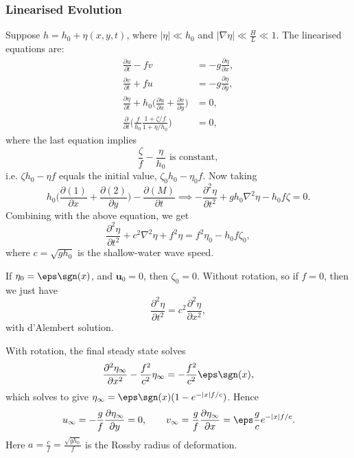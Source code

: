 \documentclass[12pt]{article}
\begin{document}
\subsubsection{Linearised Evolution}
\label{subsub:linearised_evolution}

Suppose $h = h_0 + \eta(x, y, t)$, where $|\eta| \ll h_0$ and $|\nabla \eta| \ll \frac{H}{L} \ll 1$. The linearised equations are:
\begin{align*}
	\frac{\partial u}{\partial t} - fv &= - g \frac{\partial \eta}{\partial x}, \\
	\frac{\partial v}{\partial t} + fu &= - g \frac{\partial \eta}{\partial y}, \\
	\frac{\partial \eta}{\partial t} + h_0 \biggl( \frac{\partial u}{\partial x} + \frac{\partial v}{\partial y} \biggr) &= 0, \\
	\frac{\partial}{\partial t} \biggl( \frac{f}{h_0} \frac{1 + \zeta/f}{1 + \eta/h_0} \biggr) &= 0,
\end{align*}
where the last equation implies
\[
	\frac{\zeta}{f} - \frac{\eta}{h_0} \text{ is constant},
\]
i.e. $\zeta h_0 - \eta f$ equals the initial value, $\zeta_0 h_0 - \eta_0 f$. Now taking
\[
	h_0 \biggl( \frac{\partial (1)}{\partial x} + \frac{\partial (2)}{\partial y} \biggr) - \frac{\partial (M)}{\partial t} \implies - \frac{\partial^2 \eta}{\partial t^2} + gh_0 \nabla^2 \eta - h_0 f \zeta = 0.
\]
Combining with the above equation, we get
\[
\frac{\partial^2 \eta}{\partial t^2} + c^2 \nabla^2 \eta + f^2 \eta = f^2 \eta_0 - h_0 f \zeta_0,
\]
where $c = \sqrt{gh_0}$ is the shallow-water wave speed.

\begin{exbox}
	If $\eta_0 = \eps \sgn(x)$, and $\mathbf{u}_0 = 0$, then $\zeta_0 = 0$. Without rotation, so if $f = 0$, then we just have
	\[
	\frac{\partial^2 \eta}{\partial t^2} = c^2 \frac{\partial^2 \eta}{\partial x^2},
	\]
	with d'Alembert solution.

	With rotation, the final steady state solves
	\[
	\frac{\partial^2 \eta_\infty}{\partial x^2} - \frac{f^2}{c^2} \eta_\infty = - \frac{f^2}{c^2} \eps \sgn(x),
	\]
	which solves to give $\eta_\infty = \eps \sgn(x) (1 - e^{-|x|f/c})$. Hence
	\[
	u_\infty = - \frac{g}{f} \frac{\partial \eta_\infty}{\partial y} = 0, \qquad v_\infty = \frac{g}{f} \frac{\partial \eta_\infty}{\partial x} = \eps \frac{g}{c} e^{-|x|f/c}.
	\]
	Here $a = \frac{c}{f} = \frac{\sqrt{gh_0}}f$ is the Rossby radius of deformation.
\end{exbox}


\newpage

\printindex
\end{document}
